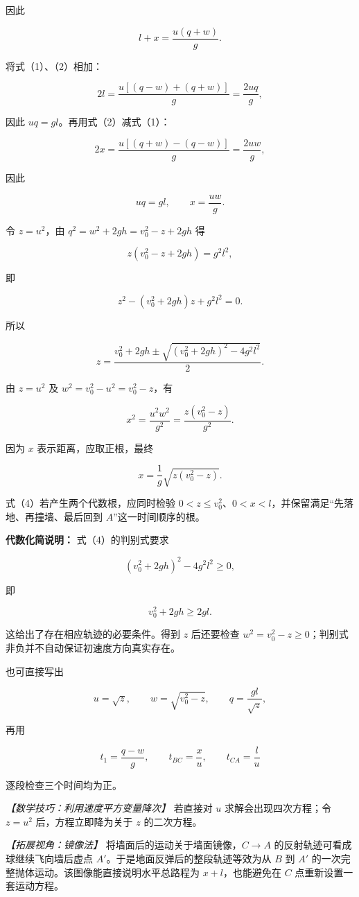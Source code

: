 \documentclass[12pt,a4paper,UTF8]{ctexart}
\begin{document}
因此

\[l+x=\frac{u(q+w)}{g}. \tag{2}\]

将式（1）、（2）相加：

\[2l=\frac{u[(q-w)+(q+w)]}{g}=\frac{2uq}{g},\]

因此 \(uq=gl\)。再用式（2）减式（1）：

\[2x=\frac{u[(q+w)-(q-w)]}{g}=\frac{2uw}{g},\]

因此

\[uq=gl,\qquad x=\frac{uw}{g}. \tag{3}\]

令 \(z=u^2\)，由 \(q^2=w^2+2gh=v_0^2-z+2gh\) 得

\[z\left(v_0^2-z+2gh\right)=g^2l^2,\]

即

\[z^2-\left(v_0^2+2gh\right)z+g^2l^2=0.\]

所以

\[z=\frac{v_0^2+2gh\pm\sqrt{\left(v_0^2+2gh\right)^2-4g^2l^2}}{2}. \tag{4}\]

由 \(z=u^2\) 及 \(w^2=v_0^2-u^2=v_0^2-z\)，有

\[x^2=\frac{u^2w^2}{g^2}
=\frac{z(v_0^2-z)}{g^2}.\]

因为 \(x\) 表示距离，应取正根，最终

\[\boxed{x=\frac1g\sqrt{z\left(v_0^2-z\right)}}. \tag{5}\]

式（4）若产生两个代数根，应同时检验
\(0<z\leq v_0^2\)、\(0<x<l\)，并保留满足``先落地、再撞墙、最后回到
\(A\)''这一时间顺序的根。

\textbf{代数化简说明：} 式（4）的判别式要求

\[\left(v_0^2+2gh\right)^2-4g^2l^2\geq0,\]

即

\[v_0^2+2gh\geq2gl.\]

这给出了存在相应轨迹的必要条件。得到 \(z\) 后还要检查
\(w^2=v_0^2-z\geq0\)；判别式非负并不自动保证初速度方向真实存在。

也可直接写出

\[u=\sqrt z,\qquad
w=\sqrt{v_0^2-z},\qquad
q=\frac{gl}{\sqrt z},\]

再用

\[t_1=\frac{q-w}{g},\qquad
t_{BC}=\frac{x}{u},\qquad
t_{CA}=\frac{l}{u}\]

逐段检查三个时间均为正。

\emph{【数学技巧：利用速度平方变量降次】} 若直接对 \(u\)
求解会出现四次方程；令 \(z=u^2\) 后，方程立即降为关于 \(z\) 的二次方程。

\emph{【拓展视角：镜像法】} 将墙面后的运动关于墙面镜像，\(C\to A\)
的反射轨迹可看成球继续飞向墙后虚点
\(A'\)。于是地面反弹后的整段轨迹等效为从 \(B\) 到 \(A'\)
的一次完整抛体运动。该图像能直接说明水平总路程为 \(x+l\)，也能避免在
\(C\) 点重新设置一套运动方程。
\end{document}
